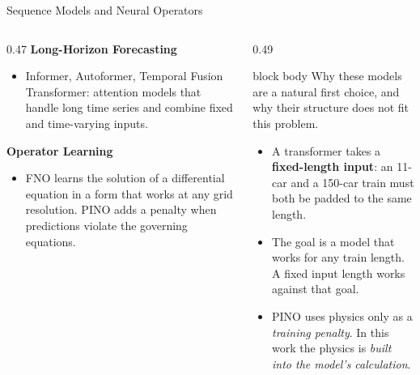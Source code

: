 \begin{frame}{Sequence Models and Neural Operators}
  \vspace{0.3em}
  \begin{columns}[T,onlytextwidth]
    \begin{column}{0.47\textwidth}
      {\small\textbf{Long-Horizon Forecasting}}
      \begin{itemize}\setlength\itemsep{0.35em}
        \item[] {\footnotesize Informer, Autoformer, Temporal Fusion Transformer:
              attention models that handle long time series and combine fixed
              and time-varying inputs.}
      \end{itemize}
      \vspace{0.6em}
      {\small\textbf{Operator Learning}}
      \begin{itemize}\setlength\itemsep{0.35em}
        \item[] {\footnotesize FNO learns the solution of a differential
              equation in a form that works at any grid resolution. PINO adds a
              penalty when predictions violate the governing equations.}
      \end{itemize}
    \end{column}
    \begin{column}{0.49\textwidth}
      \begin{beamercolorbox}[wd=\linewidth,sep=6pt]{block body}
        {\footnotesize Why these models are a natural first choice, and why
         their structure does not fit this problem.}
      \end{beamercolorbox}
      \vspace{0.5em}
      \begin{itemize}\setlength\itemsep{0.5em}
        \item A transformer takes a \textbf{fixed-length input}: an 11-car and a
              150-car train must both be padded to the same length.
        \item \alert{The goal is a model that works for any train length.} A
              fixed input length works against that goal.
        \item PINO uses physics only as a \emph{training penalty}. In this work
              the physics is \emph{built into the model's calculation}.
      \end{itemize}
    \end{column}
  \end{columns}
\end{frame}

